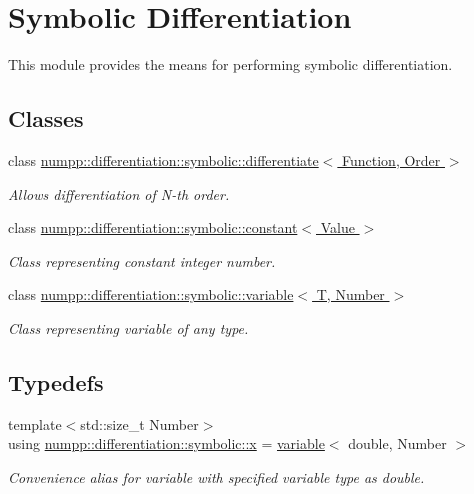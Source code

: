 \hypertarget{group__numpp__differentiation__symbolic}{}\section{Symbolic Differentiation}
\label{group__numpp__differentiation__symbolic}


This module provides the means for performing symbolic differentiation.  


\subsection*{Classes}
\begin{DoxyCompactItemize}
\item 
class \hyperlink{classnumpp_1_1differentiation_1_1symbolic_1_1differentiate}{numpp\+::differentiation\+::symbolic\+::differentiate$<$ Function, Order $>$}
\begin{DoxyCompactList}\small\item\em Allows differentiation of N-\/th order. \end{DoxyCompactList}\item 
class \hyperlink{classnumpp_1_1differentiation_1_1symbolic_1_1constant}{numpp\+::differentiation\+::symbolic\+::constant$<$ Value $>$}
\begin{DoxyCompactList}\small\item\em Class representing constant integer number. \end{DoxyCompactList}\item 
class \hyperlink{classnumpp_1_1differentiation_1_1symbolic_1_1variable}{numpp\+::differentiation\+::symbolic\+::variable$<$ T, Number $>$}
\begin{DoxyCompactList}\small\item\em Class representing variable of any type. \end{DoxyCompactList}\end{DoxyCompactItemize}
\subsection*{Typedefs}
\begin{DoxyCompactItemize}
\item 
\mbox{\label{group__numpp__differentiation__symbolic_gac865497d2896f51d0cab2e9c64799a15}} 
{\footnotesize template$<$std\+::size\+\_\+t Number$>$ }\\using \hyperlink{group__numpp__differentiation__symbolic_gac865497d2896f51d0cab2e9c64799a15}{numpp\+::differentiation\+::symbolic\+::x} = \hyperlink{classnumpp_1_1differentiation_1_1symbolic_1_1variable}{variable}$<$ double, Number $>$
\begin{DoxyCompactList}\small\item\em Convenience alias for variable with specified variable type as double. \end{DoxyCompactList}\end{DoxyCompactItemize}
